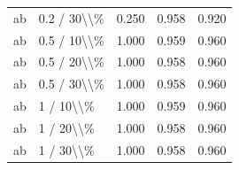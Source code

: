 \begin{table}[!h]
\begin{tabular}[t]{llccc}
\addlinespace
ab & 0.2 / 30\textbackslash{}\textbackslash{}\% & 0.250 & 0.958 & 0.920\\
ab & 0.5 / 10\textbackslash{}\textbackslash{}\% & 1.000 & 0.959 & 0.960\\
ab & 0.5 / 20\textbackslash{}\textbackslash{}\% & 1.000 & 0.958 & 0.960\\
ab & 0.5 / 30\textbackslash{}\textbackslash{}\% & 1.000 & 0.958 & 0.960\\
ab & 1 / 10\textbackslash{}\textbackslash{}\% & 1.000 & 0.959 & 0.960\\
\addlinespace
ab & 1 / 20\textbackslash{}\textbackslash{}\% & 1.000 & 0.958 & 0.960\\
ab & 1 / 30\textbackslash{}\textbackslash{}\% & 1.000 & 0.958 & 0.960\\
\bottomrule
\end{tabular}
\end{table}
